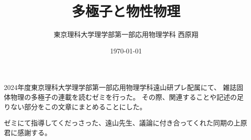 \documentclass[11pt,dvipdfmx,a4paper]{jsreport}
\title{多極子と物性物理}
\author{東京理科大学理学部第一部応用物理学科 西原翔}
\date{\today}
\begin{document}

\maketitle

2024年度東京理科大学理学部第一部応用物理学科遠山研プレ配属にて、
雑誌固体物理の多極子の連載を読むゼミを行った。
その際、関連することや記述の足りない部分をこの文章にまとめることにした。

ゼミにて指導してくだっさった、遠山先生、議論に付き合ってくれた同期の上原君に感謝する。
\clearpage
\tableofcontents

\clearpage





\end{document}
